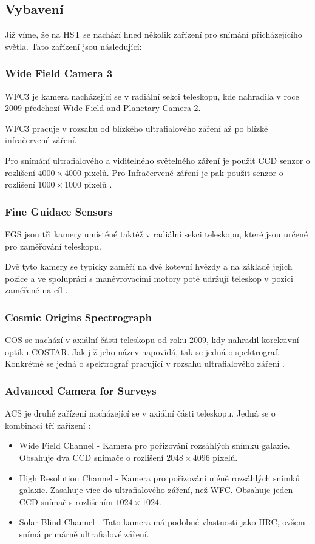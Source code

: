 \documentclass[a4paper,11pt]{article}
\begin{document}
\subsection{Vybavení}
Již víme, že na HST se nachází hned několik zařízení pro snímání přicházejícího světla. Tato zařízení jsou následující:
\subsubsection{Wide Field Camera 3}
WFC3 je kamera nacházející se v radiální sekci teleskopu, kde nahradila v roce 2009 předchozí Wide Field and Planetary Camera 2.

WFC3 pracuje v rozsahu od blízkého ultrafialového záření až po blízké infračervené záření.

Pro snímání ultrafialového a viditelného světelného záření je použit CCD senzor o rozlišení $4000 \times 4000$ pixelů. Pro Infračervené záření je pak použit senzor o rozlišení $1000 \times 1000$ pixelů \cite{ballWfc3}.

\subsubsection{Fine Guidace Sensors}
FGS jsou tři kamery umístěné taktéž v radiální sekci teleskopu, které jsou určené pro zaměřování teleskopu.

Dvě tyto kamery se typicky zaměří na dvě kotevní hvězdy a na základě jejich pozice a ve spolupráci s manévrovacími motory poté udržují teleskop v pozici zaměřené na cíl \cite{hubblesiteFgs}.

\subsubsection{Cosmic Origins Spectrograph}
COS se nachází v axiální části teleskopu od roku 2009, kdy nahradil korektivní optiku COSTAR. Jak již jeho název napovídá, tak se jedná o spektrograf. Konkrétně se jedná o spektrograf pracující v rozsahu ultrafialového záření \cite{hubblesiteCos}.

\subsubsection{Advanced Camera for Surveys}
ACS je druhé zařízení nacházející se v axiální části teleskopu. Jedná se o kombinaci tří zařízení \cite{stsciDetectors}:
\begin{itemize}
	\item Wide Field Channel - Kamera pro pořizování rozsáhlých snímků galaxie. Obsahuje dva CCD snímače o rozlišení $2048 \times 4096$ pixelů.
	\item High Resolution Channel - Kamera pro pořizování méně rozsáhlých snímků galaxie. Zasahuje více do ultrafialového záření, než WFC. Obsahuje jeden CCD snímač s rozlišením $1024 \times 1024$.
	\item Solar Blind Channel - Tato kamera má podobné vlastnosti jako HRC, ovšem snímá primárně ultrafialové záření.
\end{itemize}
\end{document}
